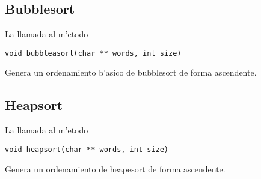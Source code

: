 \documentclass[a4paper,11pt]{article}
\begin{document}
\subsection{Bubblesort}
La llamada al m'etodo 
\begin{lstlisting}[style=BashInputStyle]
    void bubbleasort(char ** words, int size)
\end{lstlisting}
Genera un ordenamiento b'asico de bubblesort de forma ascendente.

\subsection{Heapsort}
La llamada al m'etodo 
\begin{lstlisting}[style=BashInputStyle]
    void heapsort(char ** words, int size)
\end{lstlisting}
Genera un ordenamiento de heapesort de forma ascendente.

\newpage





\end{document}
